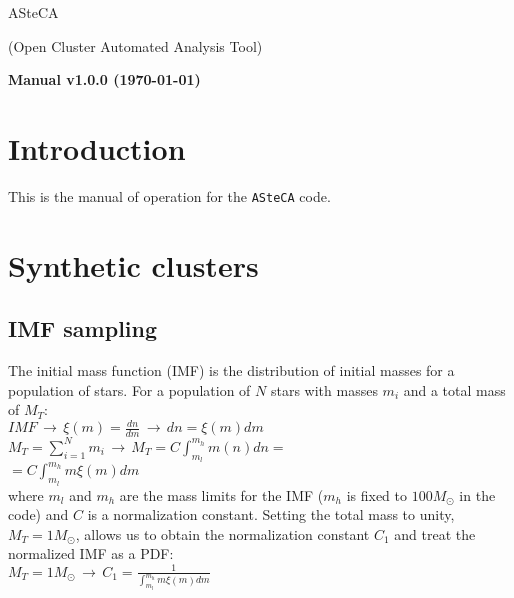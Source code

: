 \documentclass[10pt]{article}
\begin{document}
\begin{center}
\begin{Huge}
ASteCA\\
\end{Huge}
{\huge (Open Cluster Automated Analysis Tool)\\}
\vspace{1cm}
\begin{Large}
\textbf{Manual v1.0.0 (\today)}
\end{Large}
\end{center}

\clearpage

\section{Introduction}
This is the manual of operation for the \texttt{ASteCA} code.

\section{Synthetic clusters}

\subsection{IMF sampling}

The initial mass function (IMF) is the distribution of initial masses for a population
of stars. For a population of $N$ stars with masses $m_i$ and a total mass of $M_T$:\\

$IMF \, \rightarrow \, \xi(m)=\frac{dn}{dm} \, \rightarrow \,dn = \xi(m)dm$\\

$M_T= \sum_{i=1}^N m_i \, \rightarrow \, M_T = C\int_{m_l}^{m_h} m(n)dn = $\\

$= C\int_{m_l}^{m_h} m\xi(m)dm$\\

\noindent where $m_l$ and $m_h$ are the mass limits for the IMF ($m_h$ is fixed to
$100 M_{\odot}$ in the code) and $C$ is a normalization constant. Setting the total
mass to unity, $M_T=1 M_{\odot}$, allows us to obtain the normalization constant $C_1$
and treat the normalized IMF as a PDF:\\

$M_T=1M_{\odot}\, \rightarrow \, C_1 = \frac{1}{\int_{m_l}^{m_h} m\xi(m)dm}$\\
\end{document}
